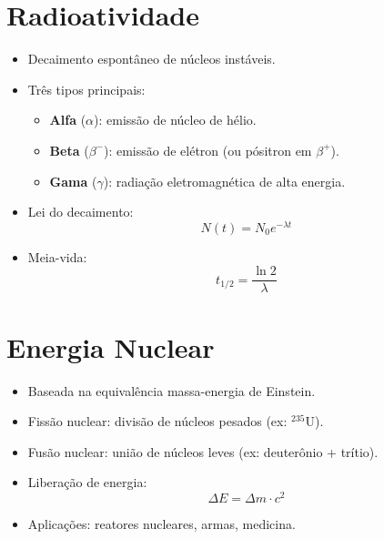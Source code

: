\documentclass[a4paper,12pt]{article}
\newcommand{\printingbibliography}{%

    \pagestyle{myheadings}
    \markright{}
    \sloppy
    \printbibliography[heading=bibintoc, %
                   title=Refer\^encias %
                  ]
    \fussy%
}
\begin{document}
\begin{multicols}{2}
\section{Radioatividade}
\begin{itemize}
    \item Decaimento espontâneo de núcleos instáveis.
    \item Três tipos principais:
    \begin{itemize}
        \item \textbf{Alfa} ($\alpha$): emissão de núcleo de hélio.
        \item \textbf{Beta} ($\beta^-$): emissão de elétron (ou pósitron em $\beta^+$).
        \item \textbf{Gama} ($\gamma$): radiação eletromagnética de alta energia.
    \end{itemize}
    \item Lei do decaimento:
    \[
        N(t) = N_0 e^{-\lambda t}
    \]
    \item Meia-vida:
    \[
        t_{1/2} = \frac{\ln 2}{\lambda}
    \]
\end{itemize}

\section{Energia Nuclear}
\begin{itemize}
    \item Baseada na equivalência massa-energia de Einstein.
    \item Fissão nuclear: divisão de núcleos pesados (ex: $^{235}$U).
    \item Fusão nuclear: união de núcleos leves (ex: deuterônio + trítio).
    \item Liberação de energia:
    \[
        \Delta E = \Delta m \cdot c^2
    \]
    \item Aplicações: reatores nucleares, armas, medicina.
\end{itemize}

\end{multicols}

\end{document}
